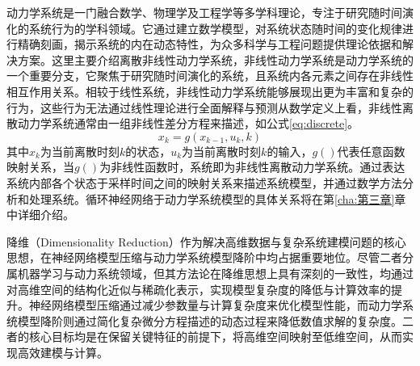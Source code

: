 动力学系统是一门融合数学、物理学及工程学等多学科理论，专注于研究随时间演化的系统行为的学科领域。它通过建立数学模型，对系统状态随时间的变化规律进行精确刻画，揭示系统的内在动态特性，为众多科学与工程问题提供理论依据和解决方案。这里主要介绍离散非线性动力学系统，非线性动力学系统是动力学系统的一个重要分支，它聚焦于研究随时间演化的系统，且系统内各元素之间存在非线性相互作用关系。相较于线性系统，非线性动力学系统能够展现出更为丰富和复杂的行为，这些行为无法通过线性理论进行全面解释与预测从数学定义上看，非线性离散动力学系统通常由一组非线性差分方程来描述，如公式\ref{eq:discrete}。
\begin{equation}
  \label{eq:discrete}
  {x_k} = g({x_{k - 1}},{u_k},k)
\end{equation}
其中$x_k$为当前离散时刻$k$的状态，$u_k$为当前离散时刻$k$的输入，$g()$代表任意函数映射关系，当$g()$为非线性函数时，系统即为非线性离散动力学系统。通过表达系统内部各个状态于采样时间之间的映射关系来描述系统模型，并通过数学方法分析和处理系统。循环神经网络于动力学系统模型的具体关系将在第\ref{cha:第三章}章中详细介绍。

降维（Dimensionality Reduction）作为解决高维数据与复杂系统建模问题的核心思想，在神经网络模型压缩与动力学系统模型降阶中均占据重要地位。尽管二者分属机器学习与动力系统领域，但其方法论在降维思想上具有深刻的一致性，均通过对高维空间的结构化近似与稀疏化表示，实现模型复杂度的降低与计算效率的提升。神经网络模型压缩通过减少参数量与计算复杂度来优化模型性能，而动力学系统模型降阶则通过简化复杂微分方程描述的动态过程来降低数值求解的复杂度。二者的核心目标均是在保留关键特征的前提下，将高维空间映射至低维空间，从而实现高效建模与计算。

